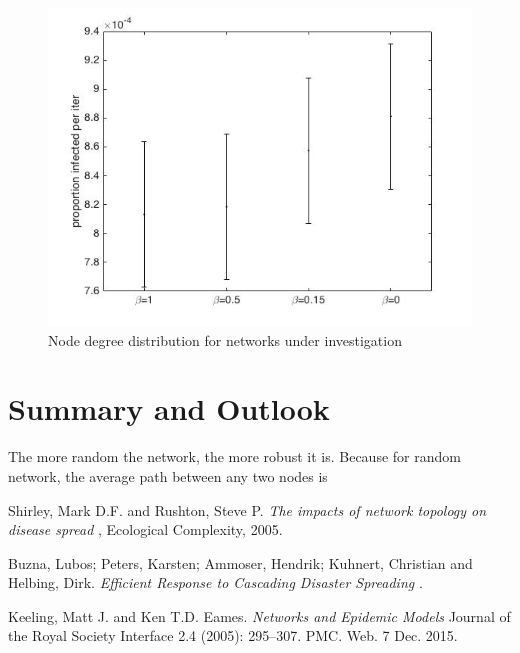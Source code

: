 \documentclass[11pt]{article}
\begin{document}
\begin{figure}[!htb]
\centering
\includegraphics[width=0.60\columnwidth]{images/periter.jpg}
\caption{Node degree distribution for networks under investigation}
\end{figure}
\clearpage

\section{Summary and Outlook}
The more random the network, the more robust it is. Because for random network, the average path between any two nodes is 




\newpage
\begin{thebibliography}{9}
 Shirley, Mark D.F. and Rushton, Steve P. \textit{ The impacts of network topology on disease spread }, Ecological Complexity, 2005.

 Buzna, Lubos; Peters, Karsten; Ammoser, Hendrik;  Kuhnert, Christian and Helbing, Dirk.\textit{ Efficient Response to Cascading Disaster Spreading } .

Keeling, Matt J. and Ken T.D. Eames. \textit{ Networks and Epidemic Models } Journal of the Royal Society Interface 2.4 (2005): 295–307. PMC. Web. 7 Dec. 2015.

\end{thebibliography}
\end{document}

